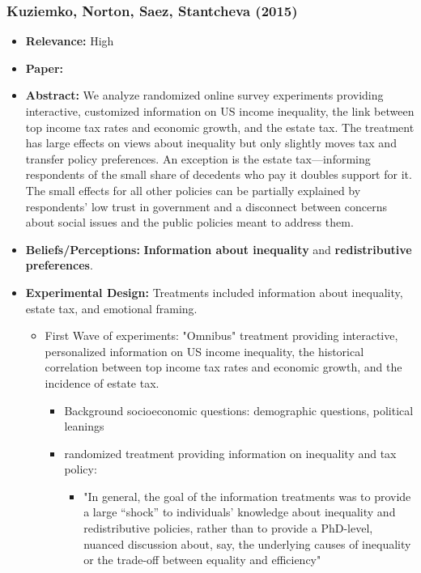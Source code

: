 \documentclass[a4paper, 12pt]{article}
\begin{document}
\subsubsection*{Kuziemko, Norton, Saez, Stantcheva (2015)}
\begin{itemize}
    \item \textbf{Relevance:} High
    \item \textbf{Paper:} 
    \item \textbf{Abstract:} We analyze randomized online survey experiments providing interactive, customized information on US income inequality, the link between top income tax rates and economic growth, and the estate tax. The treatment has large effects on views about inequality but only slightly moves tax and transfer policy preferences. An exception is the estate tax—informing respondents of the small share of decedents who pay it doubles support for it. The small effects for all other policies can be partially explained by respondents’ low trust in government and a disconnect between concerns about social issues and the public policies meant to address them.
    \item \textbf{Beliefs/Perceptions:} \textbf{Information about inequality} and \textbf{redistributive preferences}.
    \item \textbf{Experimental Design:} Treatments included information about inequality, estate tax, and emotional framing.
    \begin{itemize}
        \item First Wave of experiments: "Omnibus" treatment providing interactive, personalized information on US income inequality, the historical correlation between top income tax rates and economic growth, and the incidence of estate tax. 
        \begin{itemize}
            \item Background socioeconomic questions: demographic questions, political leanings
            \item randomized treatment providing information on inequality and tax policy: 
            \begin{itemize}
                \item "In general, the goal of the information treatments was to provide a large “shock” to individuals’ knowledge about inequality and redistributive policies, rather than to provide a PhD-level, nuanced discussion about, say, the underlying causes of inequality or the trade-off between equality and efficiency"

\end{itemize}
\end{itemize}
\end{itemize}
\end{itemize}
\end{document}
